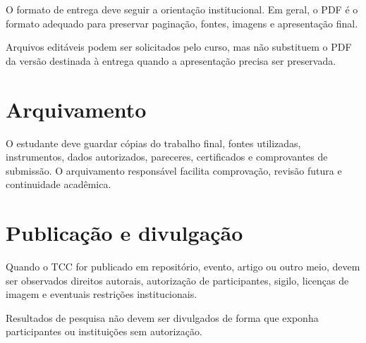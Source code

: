 O formato de entrega deve seguir a orientação institucional. Em geral, o PDF é o formato adequado para preservar paginação, fontes, imagens e apresentação final.

Arquivos editáveis podem ser solicitados pelo curso, mas não substituem o PDF da versão destinada à entrega quando a apresentação precisa ser preservada.

\section{Arquivamento}

O estudante deve guardar cópias do trabalho final, fontes utilizadas, instrumentos, dados autorizados, pareceres, certificados e comprovantes de submissão. O arquivamento responsável facilita comprovação, revisão futura e continuidade acadêmica.

\section{Publicação e divulgação}

Quando o TCC for publicado em repositório, evento, artigo ou outro meio, devem ser observados direitos autorais, autorização de participantes, sigilo, licenças de imagem e eventuais restrições institucionais.

Resultados de pesquisa não devem ser divulgados de forma que exponha participantes ou instituições sem autorização.
